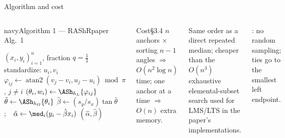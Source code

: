 \documentclass[aspectratio=169,9pt]{beamer}
\begin{document}
\begin{frame}{Algorithm and cost}
\begin{columns}[T]
\begin{rbox}{navy}{Algorithm 1 --- RAShR}{}{paper Alg.~1}
\footnotesize
\begin{algorithmic}[1]
\Require $(x_i,y_i)_{i=1}^n$, fraction $q=\tfrac12$
\State standardize: $u_i,v_i$ 
  \State $\varphi_{ij}\gets\operatorname{atan2}(v_j-v_i,u_j-u_i)\bmod\pi$, $j\ne i$
  \State $(\theta_i,w_i)\gets\ASh_{h_L}\{\varphi_{ij}\}$ 
\EndFor
\State $\hat\theta\gets\ASh_{h_O}\{\theta_i\}$
\State $\hat\beta\gets(s_y/s_x)\tan\hat\theta$;\ \ $\hat\alpha\gets\med_i(y_i-\hat\beta x_i)$
\State \Return $(\hat\alpha,\hat\beta)$
\end{algorithmic}
\end{rbox}
\begin{rdef}{Cost}{}{\S3.4}
$n$ anchors $\times$ sorting $n-1$ angles $\Rightarrow$ $O(n^2\log n)$ time; one anchor at a time $\Rightarrow$ $O(n)$ extra memory.
\end{rdef}
\small Same order as a direct repeated median; cheaper than the $O(n^3)$ exhaustive elemental-subset search used for LMS/LTS in the paper's implementations.\medskip

: no random sampling; ties go to the smallest left endpoint.
\end{columns}
\end{frame}

\end{document}
